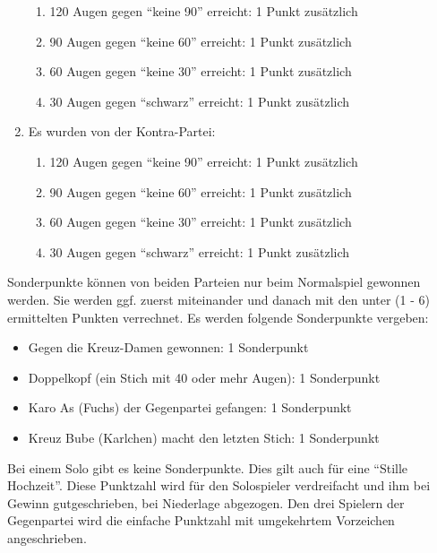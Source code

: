 \documentclass[12pt]{scrartcl}
\begin{document}
\begin{enumerate}
    \begin{enumerate}
      \item 120 Augen gegen "`keine 90"' erreicht: 1 Punkt zusätzlich
      \item 90 Augen gegen "`keine 60"' erreicht: 1 Punkt zusätzlich
      \item 60 Augen gegen "`keine 30"' erreicht: 1 Punkt zusätzlich
      \item 30 Augen gegen "`schwarz"' erreicht: 1 Punkt zusätzlich
    \end{enumerate}
  \item Es wurden von der Kontra-Partei:
    \begin{enumerate}
      \item 120 Augen gegen "`keine 90"' erreicht: 1 Punkt zusätzlich
      \item 90 Augen gegen "`keine 60"' erreicht: 1 Punkt zusätzlich
      \item 60 Augen gegen "`keine 30"' erreicht: 1 Punkt zusätzlich
      \item 30 Augen gegen "`schwarz"' erreicht: 1 Punkt zusätzlich
    \end{enumerate}
\end{enumerate}
Sonderpunkte können von beiden Parteien nur beim Normalspiel gewonnen werden.
Sie werden ggf. zuerst miteinander und danach mit den unter (1 - 6) ermittelten
Punkten verrechnet.
Es werden folgende Sonderpunkte vergeben:
\begin{itemize}
  \item Gegen die Kreuz-Damen gewonnen: 1 Sonderpunkt
  \item Doppelkopf (ein Stich mit 40 oder mehr Augen): 1 Sonderpunkt
  \item Karo As (Fuchs) der Gegenpartei gefangen: 1 Sonderpunkt
  \item Kreuz Bube (Karlchen) macht den letzten Stich: 1 Sonderpunkt
\end{itemize}
Bei einem Solo gibt es keine Sonderpunkte. Dies gilt auch für
eine "`Stille Hochzeit"'. Diese Punktzahl wird für den
Solospieler verdreifacht und ihm bei Gewinn gutgeschrieben, bei
Niederlage abgezogen. Den drei Spielern der Gegenpartei wird die
einfache Punktzahl mit umgekehrtem Vorzeichen angeschrieben.
\end{document}
